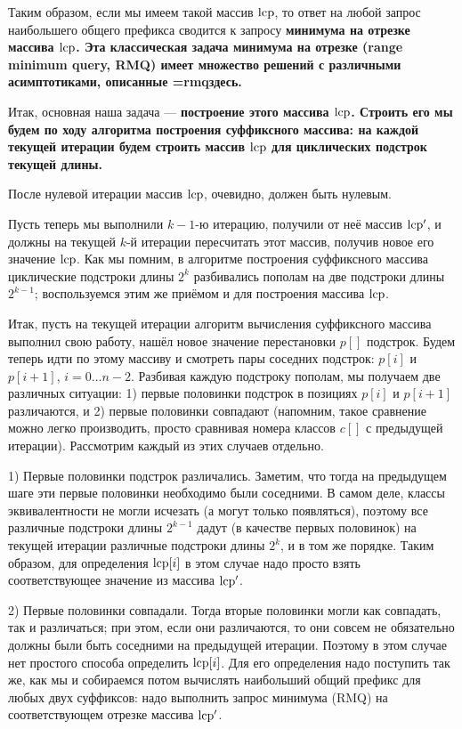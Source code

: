 Таким образом, если мы имеем такой массив $\rm lcp$, то ответ на любой запрос наибольшего общего префикса сводится к запросу \bf{минимума на отрезке} массива $\rm lcp$. Эта классическая задача минимума на отрезке (range minimum query, RMQ) имеет множество решений с различными асимптотиками, описанные \algohref=rmq{здесь}.

Итак, основная наша задача --- \bf{построение} этого массива $\rm lcp$. Строить его мы будем по ходу алгоритма построения суффиксного массива: на каждой текущей итерации будем строить массив $\rm lcp$ для циклических подстрок текущей длины.

После нулевой итерации массив $\rm lcp$, очевидно, должен быть нулевым.

Пусть теперь мы выполнили $k-1$-ю итерацию, получили от неё массив $\rm lcp^\prime$, и должны на текущей $k$-й итерации пересчитать этот массив, получив новое его значение $\rm lcp$. Как мы помним, в алгоритме построения суффиксного массива циклические подстроки длины $2^k$ разбивались пополам на две подстроки длины $2^{k-1}$; воспользуемся этим же приёмом и для построения массива $\rm lcp$.

Итак, пусть на текущей итерации алгоритм вычисления суффиксного массива выполнил свою работу, нашёл новое значение перестановки $p[]$ подстрок. Будем теперь идти по этому массиву и смотреть пары соседних подстрок: $p[i]$ и $p[i+1]$, $i=0 \ldots n-2$. Разбивая каждую подстроку пополам, мы получаем две различных ситуации: 1) первые половинки подстрок в позициях $p[i]$ и $p[i+1]$ различаются, и 2) первые половинки совпадают (напомним, такое сравнение можно легко производить, просто сравнивая номера классов $c[]$ с предыдущей итерации). Рассмотрим каждый из этих случаев отдельно.

1) Первые половинки подстрок различались. Заметим, что тогда на предыдущем шаге эти первые половинки необходимо были соседними. В самом деле, классы эквивалентности не могли исчезать (а могут только появляться), поэтому все различные подстроки длины $2^{k-1}$ дадут (в качестве первых половинок) на текущей итерации различные подстроки длины $2^k$, и в том же порядке. Таким образом, для определения ${\rm lcp}[i]$ в этом случае надо просто взять соответствующее значение из массива $\rm lcp^\prime$.

2) Первые половинки совпадали. Тогда вторые половинки могли как совпадать, так и различаться; при этом, если они различаются, то они совсем не обязательно должны были быть соседними на предыдущей итерации. Поэтому в этом случае нет простого способа определить ${\rm lcp}[i]$. Для его определения надо поступить так же, как мы и собираемся потом вычислять наибольший общий префикс для любых двух суффиксов: надо выполнить запрос минимума (RMQ) на соответствующем отрезке массива $\rm lcp^\prime$.

